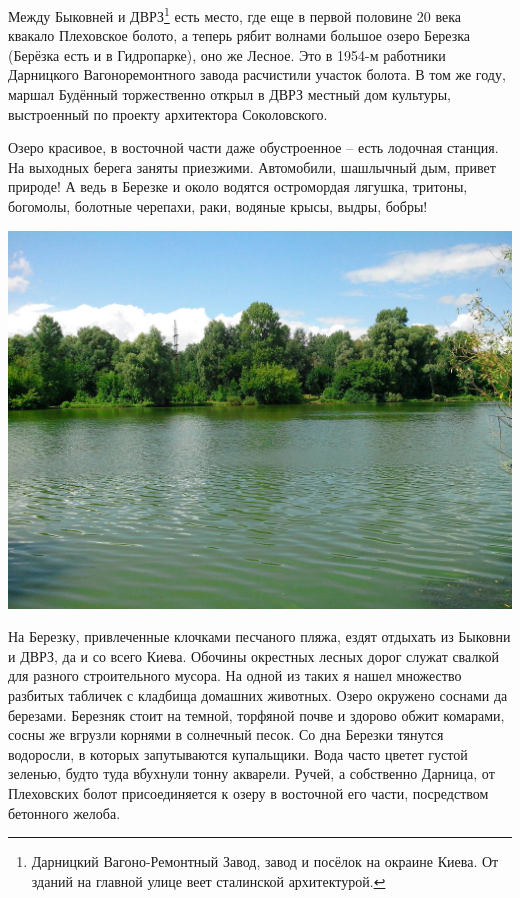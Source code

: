 Между Быковней и ДВРЗ\footnote{Дарницкий Вагоно-Ремонтный Завод, завод и посёлок на окраине Киева. От зданий на главной улице веет сталинской архитектурой.} есть место, где еще в первой половине 20 века квакало Плеховское болото, а теперь рябит волнами большое озеро Березка (Берёзка есть и в Гидропарке), оно же Лесное. Это в 1954-м работники Дарницкого Вагоноремонтного завода расчистили участок болота. В том же году, маршал Будённый торжественно открыл в ДВРЗ местный дом культуры, выстроенный по проекту архитектора Соколовского.

Озеро красивое, в восточной части даже обустроенное – есть лодочная станция. На выходных берега заняты приезжими. Автомобили, шашлычный дым, привет природе! А ведь в Березке и около водятся остромордая лягушка, тритоны, богомолы, болотные черепахи, раки, водяные крысы, выдры, бобры!

\begin{center}
\includegraphics[width=0.93\linewidth]{chast-gorodki/darn/s_darn-IMG_20130720_144259.jpg}
\end{center}

На Березку, привлеченные клочками песчаного пляжа, ездят отдыхать из Быковни и ДВРЗ, да и со всего Киева. Обочины окрестных лесных дорог служат свалкой для разного строительного мусора. На одной из таких я нашел множество разбитых табличек с кладбища домашних животных. Озеро окружено соснами да березами. Березняк стоит на темной, торфяной почве и здорово обжит комарами, сосны же вгрузли корнями в солнечный песок. Со дна Березки тянутся водоросли, в которых запутываются купальщики. Вода часто цветет густой зеленью, будто туда вбухнули тонну акварели. Ручей, а собственно Дарница, от Плеховских болот присоединяется к озеру в восточной его части, посредством бетонного желоба.

